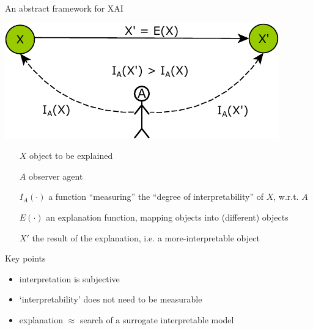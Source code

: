 \documentclass[presentation]{beamer}\mode<presentation>{\usetheme{AMSBolognaFC}}
\begin{document}
\begin{frame}[allowframebreaks]{An abstract framework for XAI}

    \begin{center}
        \includegraphics[width=.5\linewidth]{figures/framework.pdf}
    \end{center}
    \begin{itemize}
        \item[$X$] object to be explained
        \item[$A$] observer agent
        \item[$I_A(\cdot)$] a function ``measuring'' the ``degree of interpretability'' of $X$, w.r.t. $A$
        \item[$E(\cdot)$] an \alert{explanation} function, mapping objects into (different) objects      
        \item[$X'$] the \alert{result} of the explanation, i.e. a \alert{more-interpretable} object
    \end{itemize}
    
    \begin{block}{Key points}
        \begin{itemize}
            \item interpretation is \alert{subjective}
            \item `interpretability' does not need to be measurable
            \item explanation $\approx$ search of a \alert{surrogate} interpretable model
        \end{itemize}
    \end{block}
\end{frame}
\end{document}
